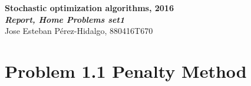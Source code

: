 \documentclass[18pt,a4paper]{article}
\begin{document}
\begin{framed}
\begin{center}
{\bf \large {Stochastic optimization algorithms, 2016}}\\
		{\large\noindent\em\bf Report, Home Problems set1}\\
		Jose Esteban Pérez-Hidalgo, 880416T670


		
\end{center}
\end{framed}

\section{Problem 1.1 Penalty Method}
\end{document}
